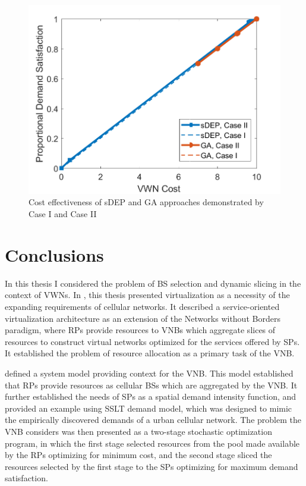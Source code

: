 \documentclass[12pt,dvipsnames]{report}
\begin{document}
\begin{figure}[htp]
	\centering
	\includegraphics[height=0.4\textheight]{Figures/CaseII_ComparisonCostvSat_CaseICaseII}
	\caption{Cost effectiveness of sDEP and GA approaches demonstrated by Case I and Case II}
	\label{fig:CaseII_ComparisonCostvSat_CaseICaseII}
\end{figure}

\fi

\iftrue
\pagebreak
\chapter{Conclusions} \label{ch:conc}

In this thesis I considered the problem of BS selection and dynamic slicing in the context of VWNs.  In , this thesis presented virtualization as a necessity of the expanding requirements of cellular networks.  It described a service-oriented virtualization architecture as an extension of the Networks without Borders paradigm, where RPs provide resources to VNBs which aggregate slices of resources to construct virtual networks optimized for the services offered by SPs.  It established the problem of resource allocation as a primary task of the VNB.

 defined a system model providing context for the VNB.  This model established that RPs provide resources as cellular BSs which are aggregated by the VNB.  It further established the needs of SPs as a spatial demand intensity function, and provided an example using SSLT demand model, which was designed to mimic the empirically discovered demands of a urban cellular network.  The problem the VNB considers was then presented as a two-stage stochastic optimization program, in which the first stage selected resources from the pool made available by the RPs optimizing for minimum cost, and the second stage sliced the resources selected by the first stage to the SPs optimizing for maximum demand satisfaction.
\end{document}
